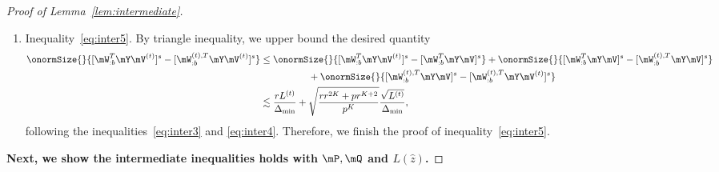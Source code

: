 \documentclass[lettersize,onecolumn,journal]{IEEEtran}
\theoremstyle{definition}
\theoremstyle{definition}
\begin{document}
\begin{proof}[Proof of Lemma~\ref{lem:intermediate}]
\begin{enumerate}[wide]
    
    For $J_2$ and $J_3$, recall that $\onormSize{}{\mW_{:b}^{(t),T} \mX \mV }$ and $\onormSize{}{\mW_{:b}^{(t),T} \mX \mV^{(t)} }$ are lower bounded by inequalities~\eqref{eq:i11_sin_dom} and \eqref{eq:j11_wxvt}, respectively. By triangle inequality and inequality \eqref{eq:cond1} in Condition~\ref{cond:origin}, we have 
    \begin{equation}\label{eq:j2}
        J_2 \leq \frac{ \onormSize{}{\mW_{:b}^{(t),T} \mE \mV}  }{  \onormSize{}{\mW_{:b}^{(t),T} \mX \mV} } \lesssim \onormSize{}{\mW_{:b}^{(t),T} \mE \mV} \lesssim \frac{r^K}{p^{K/2}},
    \end{equation}
    and 
    \begin{equation}\label{eq:j3}
        J_3 \leq \frac{ \onormSize{}{\mW_{:b}^{(t),T} \mE \mV^{(t)}}  }{  \onormSize{}{\mW_{:b}^{(t),T} \mX \mV^{(t)}} } \lesssim \onormSize{}{\mW_{:b}^{(t),T} \mE \mV} \lesssim \frac{r^K}{p^{K/2}}.
    \end{equation}
    
    Therefore, combining the inequalities~\eqref{eq:j1}, \eqref{eq:j2}, and \eqref{eq:j3}, we finish the proof of inequality~\eqref{eq:inter4}. 
    
    

    \item Inequality~\eqref{eq:inter5}. By triangle inequality, we upper bound the desired quantity 
    \begin{align}
        \onormSize{}{ [ \mW_{:b}^T \mY \mV^{(t)} ]^s   -  [ \mW_{:b}^{(t), T} \mY \mV^{(t)} ]^s } &\leq \onormSize{}{[ \mW_{:b}^T \mY \mV^{(t)} ]^s - [ \mW_{:b}^T \mY \mV ]^s }  + \onormSize{}{[\mW_{:b}^T \mY \mV ]^s  - [ \mW_{:b}^{(t),T} \mY \mV ]^s } \\
        & \quad \quad \quad\quad\quad+ \onormSize{}{[\mW_{:b}^{(t),T} \mY \mV ]^s  -  [\mW_{:b}^{(t), T} \mY \mV^{(t)} ]^s }\\
        &\lesssim \frac{r L^{(t)}}{\Delta_{\min}} + \sqrt{ \frac{rr^{2K} + p r^{K+2}}{p^{K}}}  \frac{\sqrt{L^{(t)}}}{\Delta_{\min}},
    \end{align}
    following the inequalities~\eqref{eq:inter3} and \eqref{eq:inter4}. Therefore, we finish the proof of inequality~\eqref{eq:inter5}.
        \end{enumerate}
  {
  \color{blue}
  \textbf{Next, we show the intermediate inequalities holds with $\mP, \mQ$ and $L(\hat z)$.}
        
}
\end{proof}
\end{document}
